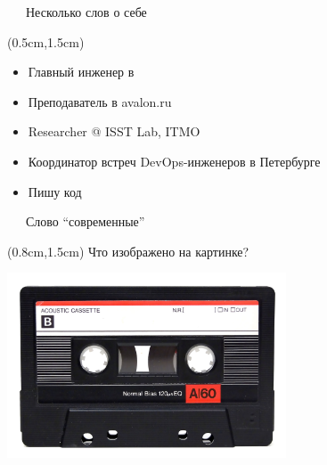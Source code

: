 \documentclass[xetex,18pt,aspectratio=43]{beamer}
\begin{document}
\begin{Large}
\begin{frame}{\ \ \ Несколько слов о себе}
\begin{textblock*}{\framewidth-0.8cm}(0.5cm,1.5cm) %
\begin{itemize}
  \item Главный инженер в \href{https://gitinsky.com}{\color{blue}{Git in Sky}}
  \item Преподаватель в avalon.ru
  \item Researcher @ ISST Lab, ITMO
  \item Координатор встреч DevOps-инженеров в Петербурге
  \item Пишу код
\end{itemize}
\end{textblock*}
\end{frame}

\begin{frame}{\ \ \ Слово \enquote{современные}}
\begin{textblock*}{\framewidth}(0.8cm,1.5cm) %
Что изображено на картинке?
\begin{minipage}{\textwidth}
  \centering
  \includegraphics[height=5.5cm]{img/cassette}
\end{minipage}
\end{textblock*}
\end{frame}




\end{Large}
\end{document}
